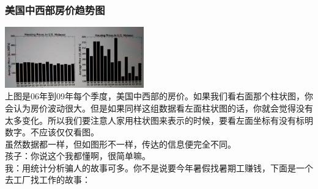 \hypertarget{ux7f8eux56fdux4e2dux897fux90e8ux623fux4ef7ux8d8bux52bfux56fe}{%
\subsubsection{美国中西部房价趋势图}\label{ux7f8eux56fdux4e2dux897fux90e8ux623fux4ef7ux8d8bux52bfux56fe}}


\includegraphics[width=6cm]{Stat_f22-1_11.png}\\



上图是06年到09年每个季度，美国中西部的房价。如果我们看右面那个柱状图，你会认为房价波动很大。但是如果同样这组数据看左面柱状图的话，你就会觉得没有太多变化。所以我们要注意人家用柱状图来表示的时候，要看左面坐标有没有标明数字。不应该仅仅看图。\\
虽然数据都一样，但如图形不一样，传达的信息便完全不同。\\
孩子：你说这个我都懂啊，很简单嘛。\\
我：用统计分析骗人的故事可多。你不是说要今年暑假找暑期工赚钱，下面是一个去工厂找工作的故事：\\

